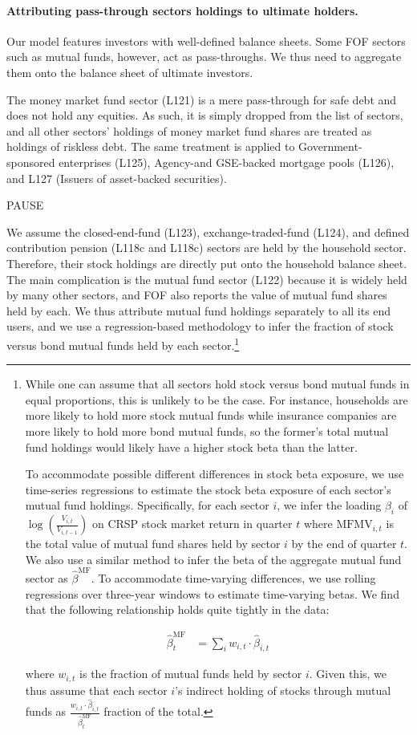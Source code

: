 \documentclass[pdftex,12pt,a4paper]{article}
\begin{document}
\paragraph{Attributing pass-through sectors holdings to ultimate holders.}
Our model features investors with well-defined balance sheets. Some FOF sectors such as mutual funds, however, act as pass-throughs. We thus need to aggregate them onto the balance sheet of ultimate investors.

The money market fund sector (L121) is a mere pass-through for safe debt and does not hold any equities. As such, it is simply dropped from the list of sectors, and all other sectors' holdings of money market fund shares are treated as holdings of riskless debt. The same treatment is applied to Government-sponsored enterprises (L125), Agency-and GSE-backed mortgage pools (L126), and L127 (Issuers of asset-backed securities). 

PAUSE

We assume the closed-end-fund (L123), exchange-traded-fund (L124), and defined contribution pension (L118c and L118c) sectors are held by the household sector. Therefore, their stock holdings are directly put onto the household balance sheet. The main complication is the mutual fund sector (L122) because it is widely held by many other sectors, and FOF also reports the value of mutual fund shares held by each. We thus attribute mutual fund holdings separately to all its end users, and we use a regression-based methodology to infer the fraction of stock versus bond mutual funds held by each sector.\footnote{While one can assume that all sectors hold stock versus bond mutual funds in equal proportions, this is unlikely to be the case. For instance, households are more likely to hold more stock mutual funds while insurance companies are more likely to hold more bond mutual funds, so the former's total mutual fund holdings would likely have a higher stock beta than the latter. 

To accommodate possible different differences in stock beta exposure, we use time-series regressions to estimate the stock beta exposure of each sector's mutual fund holdings. Specifically, for each sector $i$, we infer the loading $\beta_i$ of $\log\left( \frac{V_{i,t}}{V_{i,t-1}} \right)$ on CRSP stock market return in quarter $t$ where $\text{MFMV}_{i,t}$ is the total value of mutual fund shares held by sector $i$ by the end of quarter $t$. We also use a similar method to infer the beta of the aggregate mutual fund sector as $\hat{\beta}^\text{MF}$. To accommodate time-varying differences, we use rolling regressions over three-year windows to estimate time-varying betas. We find that the following relationship holds quite tightly in the data:

\begin{align*}
\hat{\beta}^\text{MF}_t & = \sum_i w_{i,t} \cdot \hat{\beta}_{i,t}
\end{align*}

\noindent where $w_{i,t}$ is the fraction of mutual funds held by sector $i$. Given this, we thus assume that each sector $i$'s indirect holding of stocks through mutual funds as $\frac{w_{i,t} \cdot \hat{\beta}_{i,t}}{\hat{\beta}_t^\text{MF}}$ fraction of the total. 
}
\end{document}
